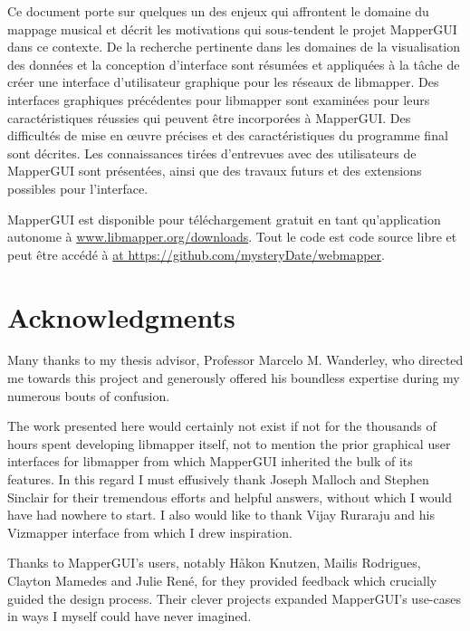 \documentclass [12pt,letterpaper]{report}
\begin{document}
Ce document porte sur quelques un des enjeux qui affrontent le domaine du mappage musical et d\'ecrit les motivations qui sous-tendent le projet MapperGUI dans ce contexte. De la recherche pertinente dans les domaines de la visualisation des donn\'ees et la conception d’interface sont r\'esum\'ees et appliqu\'ees \`a la tâche de cr\'eer une interface d’utilisateur graphique pour les r\'eseaux de libmapper. Des interfaces graphiques pr\'ec\'edentes pour libmapper sont examin\'ees pour leurs caract\'eristiques r\'eussies qui peuvent \^etre incorpor\'ees \`a MapperGUI. Des difficult\'es de mise en \oe uvre pr\'ecises et des caract\'eristiques du programme final sont d\'ecrites. Les connaissances tir\'ees d’entrevues avec des utilisateurs de MapperGUI sont pr\'esent\'ees, ainsi que des travaux futurs et des extensions possibles pour l’interface.

MapperGUI est disponible pour t\'el\'echargement gratuit en tant qu’application autonome \`a \url{www.libmapper.org/downloads}. Tout le code est code source libre et peut être acc\'ed\'e \`a \url{at https://github.com/mysteryDate/webmapper}.

\pagebreak

\section*{\centering Acknowledgments}

Many thanks to my thesis advisor, Professor Marcelo M. Wanderley, who directed me towards this project and generously offered his boundless expertise during my numerous bouts of confusion.

The work presented here would certainly not exist if not for the thousands of hours spent developing libmapper itself, not to mention the prior graphical user interfaces for libmapper from which MapperGUI inherited the bulk of its features. In this regard I must effusively thank Joseph Malloch and Stephen Sinclair for their tremendous efforts and helpful answers, without which I would have had nowhere to start. I also would like to thank Vijay Ruraraju and his Vizmapper interface from which I drew inspiration.

Thanks to MapperGUI's users, notably H\aa kon Knutzen, Mailis Rodrigues, Clayton Mamedes and Julie Ren\'e, for they provided feedback which crucially guided the design process. Their clever projects expanded MapperGUI's use-cases in ways I myself could have never imagined.
\end{document}

